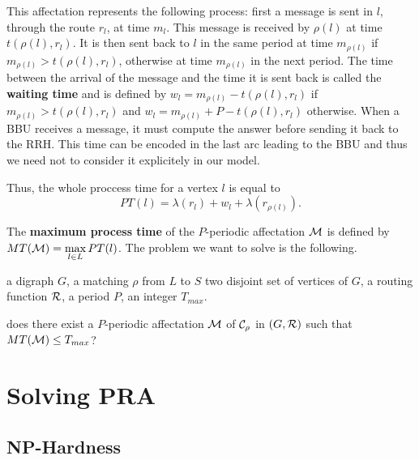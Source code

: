\documentclass[a4paper,10pt]{article}
\begin{document}
      This affectation represents the following process: first a message is sent in $l$, through the route $r_l$, at time $m_l$.
      This message is received by $\rho(l)$ at time $t(\rho(l),r_l)$. It is then sent back to $l$ in the same period at time $m_{\rho(l)}$ if $m_{\rho(l)} > t(\rho(l),r_l)$, otherwise at time $m_{\rho(l)}$ in the next period. The time between the arrival of the message and the time it is sent back is called the \textbf{waiting time} and is defined by $w_l = m_{\rho(l)} - t(\rho(l),r_l)$ if $m_{\rho(l)} > t(\rho(l),r_l)$ and $w_l = m_{\rho(l)} + P - t(\rho(l),r_l)$ otherwise.
      When a BBU receives a message, it must compute the answer before sending it back to the RRH. This time can be encoded
      in the last arc leading to the BBU and thus we need not to consider it explicitely in our model.
    
      Thus, the whole proccess time for a vertex $l$ is equal to
      $$
      PT(l)=\lambda(r_l)+ w_l+\lambda(r_{\rho(l)}).
      $$
      
    The {\bf maximum process time} of the $P$-periodic affectation ${\cal M} $ is defined by $MT({\cal M})=\max\limits_{l \in L} PT(l)$. The problem we want to solve is the following. 


        a digraph $G$, a matching $\rho$ from $L$ to $S$ two disjoint set of vertices of $G$, a routing function $\cal R$, a period $P$, an integer $T_{max}$.

       does there exist a $P$-periodic affectation ${\cal M}$ of ${\cal C}_{\rho}$ in $(G,{\cal R})$ such that $MT({\cal M}) \leq T_{max}$?




  
\section{Solving PRA}
  \label{sec:complexity}
  \subsection{NP-Hardness}
\end{document}
